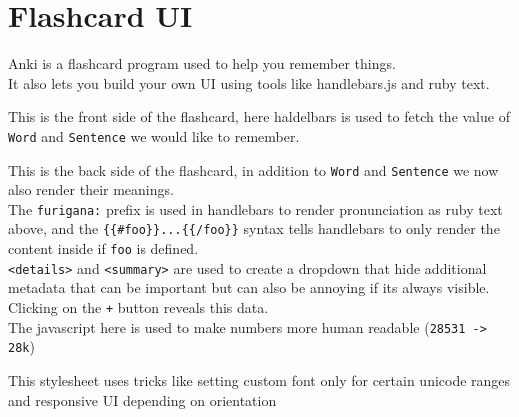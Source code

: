\documentclass[12pt]{article}
\begin{document}
\section{Flashcard UI}
{\Large \raggedright
  Anki is a flashcard program used to help you remember things. \\
  It also lets you build your own UI using tools like handlebars.js and ruby text. \\
}
\vspace*{3\baselineskip}

{\Large \raggedright
  This is the front side of the flashcard, here haldelbars is used to fetch the value of \verb|Word| and \verb|Sentence| we would like to remember. \\
}
\newpage

{\Large \raggedright
  This is the back side of the flashcard, in addition to \verb|Word| and \verb|Sentence| we now also render their meanings. \\
  \vspace*{1\baselineskip}
  The \verb|furigana:| prefix is used in handlebars to render pronunciation as ruby text above, and the \verb|{{#foo}}...{{/foo}}| syntax tells handlebars to only render the content inside if \verb|foo| is defined. \\
  \vspace*{1\baselineskip}
  \verb|<details>| and \verb|<summary>| are used to create a dropdown that hide additional metadata that can be important but can also be annoying if its always visible. Clicking on the \verb|+| button reveals this data. \\
  \vspace*{1\baselineskip}
  The javascript here is used to make numbers more human readable (\verb|28531 -> 28k|) \\
}
\newpage

\vspace*{1\baselineskip}
{\Large \raggedright
  This stylesheet uses tricks like setting custom font only for certain unicode ranges and responsive UI depending on orientation \\
}
\end{document}
